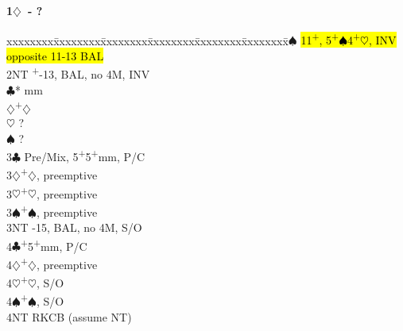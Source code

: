 \documentclass[10pt]{article}
\renewcommand{\c}{$\clubsuit$}
\renewcommand{\d}{$\diamondsuit$}
\newcommand{\h}{$\heartsuit$}
\newcommand{\s}{$\spadesuit$}
\newcommand{\p}{\textsuperscript{+}}
\newcommand{\x}{DBL}
\newenvironment{bidtable}[1][]
{\textbf{#1}
  \begin{adjustwidth}{1em}{}
    \addvspace{2pt}
    \begin{tabbing}
      xxxxxxxx\=xxxxxxxx\=xxxxxxxx\=xxxxxxxx\=xxxxxxxx\=xxxxxxxx\=\kill}
{\end{tabbing}\end{adjustwidth}\bigskip}%
\begin{document}
\begin{multicols*}{2}
\begin{bidtable}[1\d\ - ?]
2\s       \> \hl{11\p, 5\p\s 4\p\h, INV opposite 11-13 BAL}     \\
2NT       \p-13, BAL, no 4M, INV                           \\
          \c*       {} mm                              \\
          \d        {}\p\d                              \\
          \h        \> ?                                  \\
          \s        \> ?                                  \\
3\c       \> Pre/Mix, 5\p 5\p mm, P/C                         \\
3\d       {}\p\d, preemptive                                \\
3\h       {}\p\h, preemptive                                \\
3\s       {}\p\s, preemptive                                \\
3NT       -15, BAL, no 4M, S/O                           \\
4\c       {}\p 5\p mm, P/C                                  \\
4\d       {}\p\d, preemptive                                \\
4\h       {}\p\h, S/O                                       \\
4\s       {}\p\s, S/O                                       \\
4NT       \> RKCB (assume NT)
\end{bidtable}


\end{multicols*}
\end{document}
